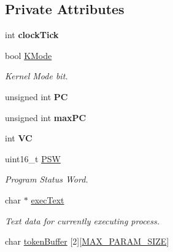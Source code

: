 \subsection*{\-Private \-Attributes}
\begin{DoxyCompactItemize}
\item 
\hypertarget{classcCPU_a11a80a1e97141537b44499364c67c8a4}{int {\bfseries clock\-Tick}}\label{d2/dc6/classcCPU_a11a80a1e97141537b44499364c67c8a4}

\item 
bool \hyperlink{classcCPU_af1d6fd5349bde1621595f6c1422792b4}{\-K\-Mode}
\begin{DoxyCompactList}\small\item\em \-Kernel \-Mode bit. \end{DoxyCompactList}\item 
\hypertarget{classcCPU_a982f4af913ec39928e62129200c21e58}{unsigned int {\bfseries \-P\-C}}\label{d2/dc6/classcCPU_a982f4af913ec39928e62129200c21e58}

\item 
\hypertarget{classcCPU_af6d922807d65a8a39722dde518febc52}{unsigned int {\bfseries max\-P\-C}}\label{d2/dc6/classcCPU_af6d922807d65a8a39722dde518febc52}

\item 
\hypertarget{classcCPU_aae9fc88ce939489754ac776b6447607b}{int {\bfseries \-V\-C}}\label{d2/dc6/classcCPU_aae9fc88ce939489754ac776b6447607b}

\item 
\hypertarget{classcCPU_a52457b3189761c2f07c9fb12169dad50}{uint16\-\_\-t \hyperlink{classcCPU_a52457b3189761c2f07c9fb12169dad50}{\-P\-S\-W}}\label{d2/dc6/classcCPU_a52457b3189761c2f07c9fb12169dad50}

\begin{DoxyCompactList}\small\item\em \-Program \-Status \-Word. \end{DoxyCompactList}\item 
\hypertarget{classcCPU_ad50800fe39f7f8d51dc7095e441db94a}{char $\ast$ \hyperlink{classcCPU_ad50800fe39f7f8d51dc7095e441db94a}{exec\-Text}}\label{d2/dc6/classcCPU_ad50800fe39f7f8d51dc7095e441db94a}

\begin{DoxyCompactList}\small\item\em \-Text data for currently executing process. \end{DoxyCompactList}\item 
\hypertarget{classcCPU_a06d3e3497a2636740db81fa00641fd88}{char \hyperlink{classcCPU_a06d3e3497a2636740db81fa00641fd88}{token\-Buffer} \mbox{[}2\mbox{]}\mbox{[}\hyperlink{cpu_8h_a9e34e5196b1f8e4c96f229d062c73fe0}{\-M\-A\-X\-\_\-\-P\-A\-R\-A\-M\-\_\-\-S\-I\-Z\-E}\mbox{]}}\label{d2/dc6/classcCPU_a06d3e3497a2636740db81fa00641fd88}


\end{DoxyCompactItemize}

